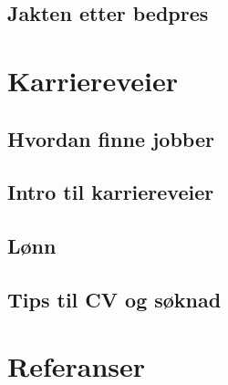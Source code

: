 \chapter{Jakten etter bedpres} \label{ch:bedpres}



\part{Karriereveier}
\newpage
\chapter{Hvordan finne jobber}


\newpage
\chapter{Intro til karriereveier}


\newpage
\chapter{Lønn}


\newpage
\chapter{Tips til CV og søknad}


\newpage
\part{Referanser}
\printbibliography[title={Referanser}] %

